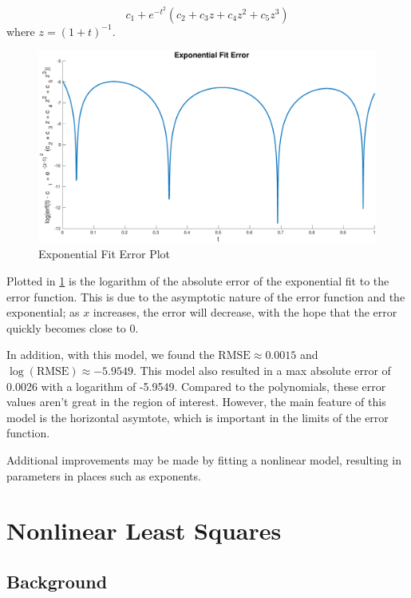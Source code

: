 \documentclass[10pt,a4paper]{article}
\begin{document}
\begin{equation}
c_1 + e^{-t^2} \left( c_2 + c_3 z + c_4 z^2 + c_5 z^3 \right)
\label{eqn: exponential model}
\end{equation}
where $z = \left( 1 + t \right)^{-1}$.

\begin{figure}[H]
\includegraphics[width=\linewidth]{Figures/experror.eps}
\caption{Exponential Fit Error Plot}
\label{fig: experrors}
\end{figure}

Plotted in \cref{fig: experrors} is the logarithm of the absolute error of the exponential fit to the error function. This is due to the asymptotic nature of the error function and the exponential; as $x$ increases, the error will decrease, with the hope that the error quickly becomes close to 0.

In addition, with this model, we found  the $\text{RMSE} \approx 0.0015$ and $\log{(\text{RMSE})} \approx -5.9549$. This model also resulted in a max absolute error of 0.0026 with a logarithm of -5.9549. Compared to the polynomials, these error values aren't great in the region of interest. However, the main feature of this model is the horizontal asymtote, which is important in the limits of the error function.

Additional improvements may be made by fitting a nonlinear model, resulting in parameters in places such as exponents.


\section*{Nonlinear Least Squares}

\subsection*{Background}
\end{document}
